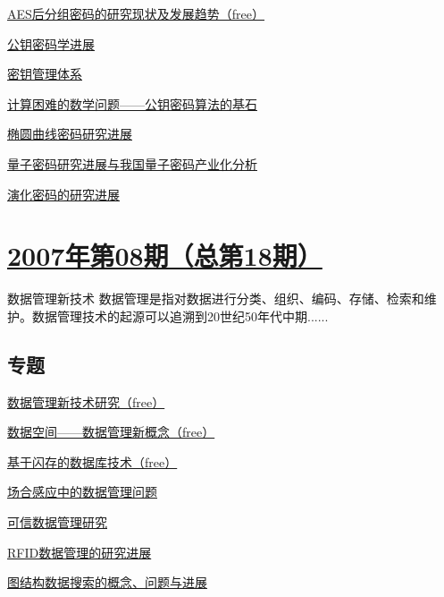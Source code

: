 \documentclass[a4paper]{article}
\begin{document}
\href{http://history.ccf.org.cn/resources/1190201776262/2010/04/15/019026.pdf}{AES后分组密码的研究现状及发展趋势（free）}

\href{http://history.ccf.org.cn/resources/1190201776262/2010/04/15/019033.pdf}{公钥密码学进展}

\href{http://history.ccf.org.cn/resources/1190201776262/2010/04/15/019044.pdf}{密钥管理体系}

\href{http://history.ccf.org.cn/resources/1190201776262/2010/04/15/019053.pdf}{计算困难的数学问题——公钥密码算法的基石}

\href{http://history.ccf.org.cn/resources/1190201776262/2010/04/15/019060.pdf}{椭圆曲线密码研究进展}

\href{http://history.ccf.org.cn/resources/1190201776262/2010/04/15/019064.pdf}{量子密码研究进展与我国量子密码产业化分析}

\href{http://history.ccf.org.cn/resources/1190201776262/2010/04/15/019076.pdf}{演化密码的研究进展}


\section{\href{http://history.ccf.org.cn/sites/ccf/jsjtbbd.jsp?contentId=2542567628971}{\textbf{2007年第08期（总第18期）}}}
数据管理新技术 数据管理是指对数据进行分类、组织、编码、存储、检索和维护。数据管理技术的起源可以追溯到20世纪50年代中期......
\subsection{专题}
\href{http://history.ccf.org.cn/resources/1190201776262/2010/04/15/018020.pdf}{数据管理新技术研究（free）}

\href{http://history.ccf.org.cn/resources/1190201776262/2010/04/15/018024.pdf}{数据空间——数据管理新概念（free）}

\href{http://history.ccf.org.cn/resources/1190201776262/2010/04/15/018030.pdf}{基于闪存的数据库技术（free）}

\href{http://history.ccf.org.cn/resources/1190201776262/2010/04/15/018036.pdf}{场合感应中的数据管理问题}

\href{http://history.ccf.org.cn/resources/1190201776262/2010/04/15/018042.pdf}{可信数据管理研究}

\href{http://history.ccf.org.cn/resources/1190201776262/2010/04/15/018050.pdf}{RFID数据管理的研究进展}

\href{http://history.ccf.org.cn/resources/1190201776262/2010/04/15/018059.pdf}{图结构数据搜索的概念、问题与进展}
\end{document}
